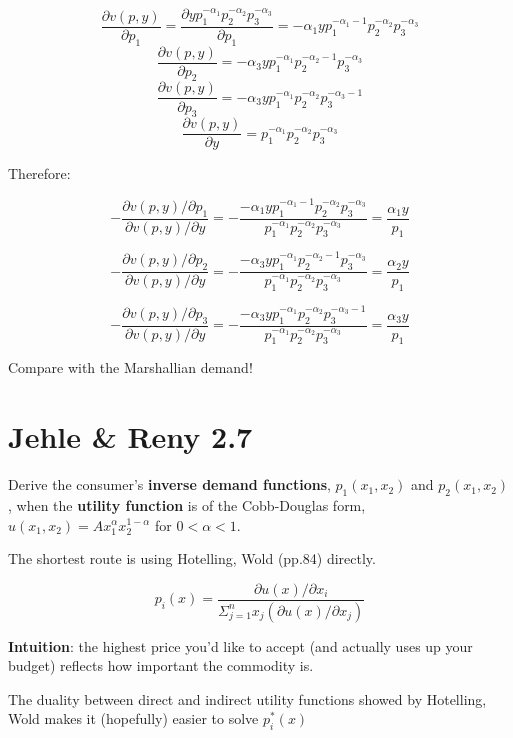 \documentclass{article}
\begin{document}
$$\frac{\partial v(p,y)} {\partial p_1} = \frac{\partial yp_1^{-\alpha_1}p_2^{-\alpha_2}p_3^{-\alpha_3}}{\partial p_1} =  -\alpha_1 yp_1^{-\alpha_1 -1}p_2^{-\alpha_2}p_3^{-\alpha_3}$$
$$\frac{\partial v(p,y)} {\partial p_2} =  -\alpha_3 yp_1^{-\alpha_1}p_2^{-\alpha_2-1}p_3^{-\alpha_3}$$
$$\frac{\partial v(p,y)} {\partial p_3} =  -\alpha_3 yp_1^{-\alpha_1}p_2^{-\alpha_2}p_3^{-\alpha_3-1}$$
$$\frac{\partial v(p,y)} {\partial y} = p_1^{-\alpha_1}p_2^{-\alpha_2}p_3^{-\alpha_3}$$

Therefore:

$$-\frac{\partial v(p,y) / \partial p_1}{\partial v(p,y) / \partial y} =-\frac{-\alpha_1 yp_1^{-\alpha_1 -1}p_2^{-\alpha_2}p_3^{-\alpha_3}}{p_1^{-\alpha_1}p_2^{-\alpha_2}p_3^{-\alpha_3}} = \frac{\alpha_1 y}{p_1}$$

$$-\frac{\partial v(p,y) / \partial p_2}{\partial v(p,y) / \partial y} =-\frac{-\alpha_3 yp_1^{-\alpha_1}p_2^{-\alpha_2-1}p_3^{-\alpha_3}}{p_1^{-\alpha_1}p_2^{-\alpha_2}p_3^{-\alpha_3}} = \frac{\alpha_2 y}{p_1}$$

$$-\frac{\partial v(p,y) / \partial p_3}{\partial v(p,y) / \partial y} =-\frac{ -\alpha_3 yp_1^{-\alpha_1}p_2^{-\alpha_2}p_3^{-\alpha_3-1}}{p_1^{-\alpha_1}p_2^{-\alpha_2}p_3^{-\alpha_3}} = \frac{\alpha_3 y}{p_1}$$

Compare with the Marshallian demand!

\section{Jehle \& Reny 2.7}
Derive the consumer's \textbf{inverse demand functions}, $p_1(x_1, x_2)$ and $p_2(x_1, x_2)$, when the \textbf{utility function} is of the Cobb-Douglas form, $u(x_1, x_2) = Ax_1^{\alpha}x_2^{1-\alpha}$ for $0 < \alpha < 1$.

\begin{mdframed}[backgroundcolor=blue!20,linecolor=white]
The shortest route is using Hotelling, Wold (pp.84) directly.

$$p_i(x) = \frac{\partial u(x) / \partial x_i}{\Sigma^{n}_{j=1} x_j( \partial u(x) / \partial x_j)}$$

\textbf{Intuition}: the highest price you'd like to accept (and actually uses up your budget) reflects how important the commodity is.

\vspace{3mm}


The duality between direct and indirect utility functions showed by Hotelling, Wold makes it (hopefully) easier to solve $p_i^*(x)$
\end{mdframed}
\end{document}
